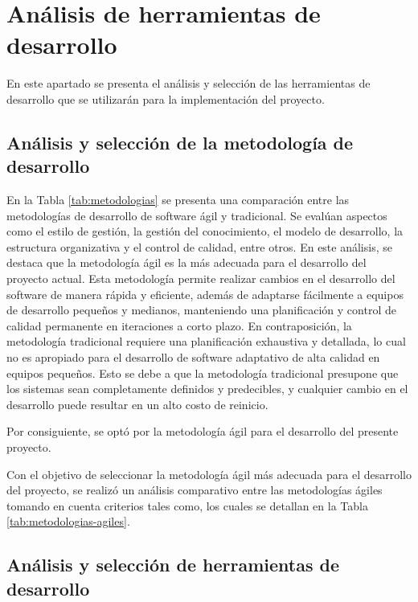 \section{Análisis de herramientas de desarrollo}
En este apartado se presenta el análisis y selección de las herramientas de desarrollo que se utilizarán para la
implementación del proyecto.

\subsection{Análisis y selección de la metodología de desarrollo}

En la Tabla \ref{tab:metodologias} se presenta una comparación entre las metodologías de desarrollo de software ágil
y tradicional. Se evalúan aspectos como el estilo de gestión, la gestión del conocimiento, el modelo de desarrollo,
la estructura organizativa y el control de calidad, entre otros. En este análisis, se destaca que la metodología ágil
es la más adecuada para el desarrollo del proyecto actual. Esta metodología permite realizar cambios en el desarrollo
del software de manera rápida y eficiente, además de adaptarse fácilmente a equipos de desarrollo pequeños y medianos,
manteniendo una planificación y control de calidad permanente en iteraciones a corto plazo. En contraposición, la
metodología tradicional requiere una planificación exhaustiva y detallada, lo cual no es apropiado para el desarrollo
de software adaptativo de alta calidad en equipos pequeños. Esto se debe a que la metodología tradicional presupone
que los sistemas sean completamente definidos y predecibles, y cualquier cambio en el desarrollo puede resultar en
un alto costo de reinicio.

\bigbreak
Por consiguiente, se optó por la metodología ágil para el desarrollo del presente proyecto.



Con el objetivo de seleccionar la metodología ágil más adecuada para el desarrollo del proyecto, se realizó un
análisis comparativo entre las metodologías ágiles tomando en cuenta criterios tales como, los cuales se detallan en
la Tabla \ref{tab:metodologias-agiles}.




\subsection{Análisis y selección de herramientas de desarrollo}

